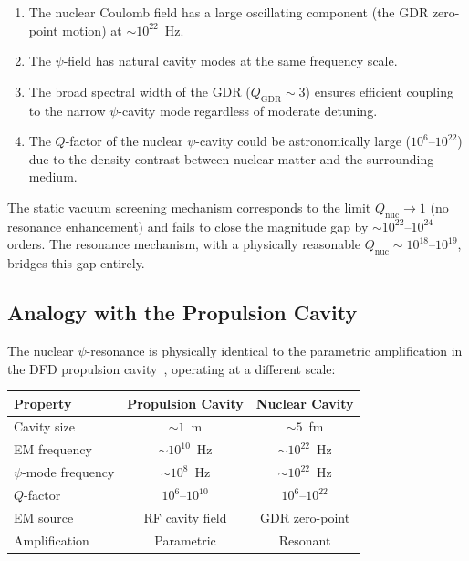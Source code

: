 \documentclass[aps,prd,twocolumn,superscriptaddress,nofootinbib]{revtex4-2}
\newcommand{\Qnuc}{Q_{\mathrm{nuc}}}
\begin{document}
\begin{enumerate}[nosep]
\item The nuclear Coulomb field has a large oscillating component
(the GDR zero-point motion) at $\sim\!10^{22}$~Hz.

\item The $\psi$-field has natural cavity modes at the same frequency
scale.

\item The broad spectral width of the GDR ($Q_{\mathrm{GDR}} \sim 3$)
ensures efficient coupling to the narrow $\psi$-cavity mode regardless
of moderate detuning.

\item The $Q$-factor of the nuclear $\psi$-cavity could be
astronomically large ($10^6$--$10^{22}$) due to the density contrast
between nuclear matter and the surrounding medium.
\end{enumerate}

The static vacuum screening mechanism corresponds to the limit
$\Qnuc \to 1$ (no resonance enhancement) and fails to close the
magnitude gap by $\sim\!10^{22}$--$10^{24}$ orders.  The resonance
mechanism, with a physically reasonable $\Qnuc \sim 10^{18}$--$10^{19}$,
bridges this gap entirely.

\subsection{Analogy with the Propulsion Cavity}
\label{sec:analogy}

The nuclear $\psi$-resonance is physically identical to the
parametric amplification in the DFD propulsion
cavity~\cite{Alcock2026Core, Alcock2026Prop}, operating at a
different scale:

\begin{center}
\renewcommand{\arraystretch}{1.3}
\begin{tabular}{lcc}
\toprule
\textbf{Property} & \textbf{Propulsion Cavity} & \textbf{Nuclear Cavity} \\
\midrule
Cavity size & $\sim\!1$~m & $\sim\!5$~fm \\
EM frequency & $\sim\!10^{10}$~Hz & $\sim\!10^{22}$~Hz \\
$\psi$-mode frequency & $\sim\!10^{8}$~Hz & $\sim\!10^{22}$~Hz \\
$Q$-factor & $10^{6}$--$10^{10}$ & $10^{6}$--$10^{22}$ \\
EM source & RF cavity field & GDR zero-point \\
Amplification & Parametric & Resonant \\
\bottomrule
\end{tabular}
\end{center}
\end{document}
